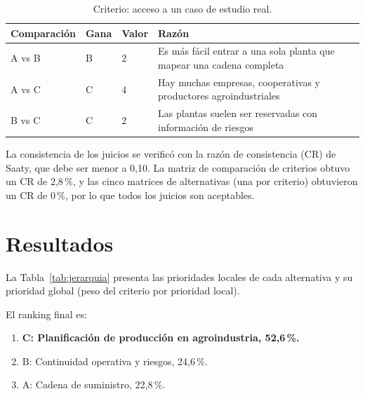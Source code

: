 \documentclass[runningheads]{llncs}
\begin{document}
\begin{table}[H]
\centering
\small
\caption{Criterio: acceso a un caso de estudio real.}
\begin{tabular}{@{}p{2cm}p{1.1cm}p{1cm}p{7.3cm}@{}}
\toprule
Comparación & Gana & Valor & Razón\\
\midrule
A vs B & B & 2 & Es más fácil entrar a una sola planta que mapear una cadena completa\\
A vs C & C & 4 & Hay muchas empresas, cooperativas y productores agroindustriales\\
B vs C & C & 2 & Las plantas suelen ser reservadas con información de riesgos\\
\bottomrule
\end{tabular}
\end{table}

La consistencia de los juicios se verificó con la razón de consistencia (CR) de Saaty, que debe ser menor a 0,10. La matriz de comparación de criterios obtuvo un CR de 2,8\,\%, y las cinco matrices de alternativas (una por criterio) obtuvieron un CR de 0\,\%, por lo que todos los juicios son aceptables.

\section{Resultados}

La Tabla~\ref{tab:jerarquia} presenta las prioridades locales de cada alternativa y su prioridad global (peso del criterio por prioridad local).

El ranking final es:
\begin{enumerate}
\item \textbf{C: Planificación de producción en agroindustria, 52,6\,\%.}
\item B: Continuidad operativa y riesgos, 24,6\,\%.
\item A: Cadena de suministro, 22,8\,\%.
\end{enumerate}
\end{document}
